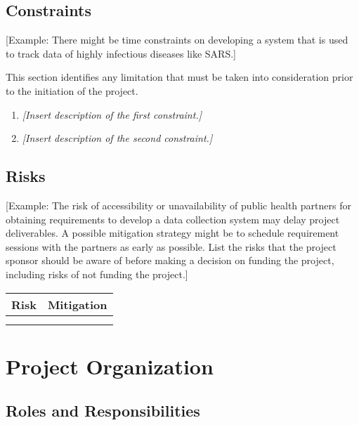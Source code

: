 \hypertarget{constraints}{%
\subsection{Constraints}\label{constraints}}

{[}Example: There might be time constraints on developing a system that
is used to track data of highly infectious diseases like SARS.{]}

This section identifies any limitation that must be taken into
consideration prior to the initiation of the project.

\begin{enumerate}
\def\labelenumi{\arabic{enumi}.}
\item
  \emph{{[}Insert description of the first constraint.{]}}
\item
  \emph{{[}Insert description of the second constraint.{]}}
\end{enumerate}

\hypertarget{risks}{%
\subsection{Risks}\label{risks}}

{[}Example: The risk of accessibility or unavailability of public health
partners for obtaining requirements to develop a data collection system
may delay project deliverables. A possible mitigation strategy might be
to schedule requirement sessions with the partners as early as possible.
List the risks that the project sponsor should be aware of before making
a decision on funding the project, including risks of not funding the
project.{]}

\begin{longtable}[]{@{}ll@{}}
\toprule
\textbf{Risk} & \textbf{Mitigation}\tabularnewline
\midrule
\endhead
&\tabularnewline
&\tabularnewline
\bottomrule
\end{longtable}

\hypertarget{project-organization}{%
\section{Project Organization}\label{project-organization}}

\hypertarget{roles-and-responsibilities}{%
\subsection{Roles and
Responsibilities}\label{roles-and-responsibilities}}

